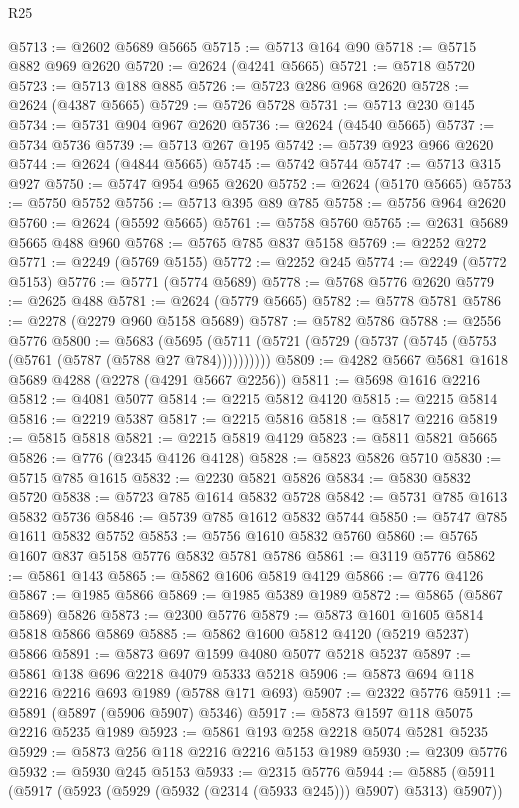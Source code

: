 \begin{lexlean}{R25}
\begin{coremodule}
@5713 := @2602 @5689 @5665
@5715 := @5713 @164 @90
@5718 := @5715 @882 @969 @2620
@5720 := @2624 (@4241 @5665)
@5721 := @5718 @5720
@5723 := @5713 @188 @885
@5726 := @5723 @286 @968 @2620
@5728 := @2624 (@4387 @5665)
@5729 := @5726 @5728
@5731 := @5713 @230 @145
@5734 := @5731 @904 @967 @2620
@5736 := @2624 (@4540 @5665)
@5737 := @5734 @5736
@5739 := @5713 @267 @195
@5742 := @5739 @923 @966 @2620
@5744 := @2624 (@4844 @5665)
@5745 := @5742 @5744
@5747 := @5713 @315 @927
@5750 := @5747 @954 @965 @2620
@5752 := @2624 (@5170 @5665)
@5753 := @5750 @5752
@5756 := @5713 @395 @89 @785
@5758 := @5756 @964 @2620
@5760 := @2624 (@5592 @5665)
@5761 := @5758 @5760
@5765 := @2631 @5689 @5665 @488 @960
@5768 := @5765 @785 @837 @5158
@5769 := @2252 @272
@5771 := @2249 (@5769 @5155)
@5772 := @2252 @245
@5774 := @2249 (@5772 @5153)
@5776 := @5771 (@5774 @5689)
@5778 := @5768 @5776 @2620
@5779 := @2625 @488
@5781 := @2624 (@5779 @5665)
@5782 := @5778 @5781
@5786 := @2278 (@2279 @960 @5158 @5689)
@5787 := @5782 @5786
@5788 := @2556 @5776
@5800 := @5683
    (@5695 (@5711 (@5721 (@5729 (@5737 (@5745 (@5753 (@5761 (@5787 (@5788 @27 @784))))))))))
@5809 := @4282 @5667 @5681 @1618 @5689 @4288 (@2278 (@4291 @5667 @2256))
@5811 := @5698 @1616 @2216
@5812 := @4081 @5077
@5814 := @2215 @5812 @4120
@5815 := @2215 @5814
@5816 := @2219 @5387
@5817 := @2215 @5816
@5818 := @5817 @2216
@5819 := @5815 @5818
@5821 := @2215 @5819 @4129
@5823 := @5811 @5821 @5665
@5826 := @776 (@2345 @4126 @4128)
@5828 := @5823 @5826 @5710
@5830 := @5715 @785 @1615
@5832 := @2230 @5821 @5826
@5834 := @5830 @5832 @5720
@5838 := @5723 @785 @1614 @5832 @5728
@5842 := @5731 @785 @1613 @5832 @5736
@5846 := @5739 @785 @1612 @5832 @5744
@5850 := @5747 @785 @1611 @5832 @5752
@5853 := @5756 @1610 @5832 @5760
@5860 := @5765 @1607 @837 @5158 @5776 @5832 @5781 @5786
@5861 := @3119 @5776
@5862 := @5861 @143
@5865 := @5862 @1606 @5819 @4129
@5866 := @776 @4126
@5867 := @1985 @5866
@5869 := @1985 @5389 @1989
@5872 := @5865 (@5867 @5869) @5826
@5873 := @2300 @5776
@5879 := @5873 @1601 @1605 @5814 @5818 @5866 @5869
@5885 := @5862 @1600 @5812 @4120 (@5219 @5237) @5866
@5891 := @5873 @697 @1599 @4080 @5077 @5218 @5237
@5897 := @5861 @138 @696 @2218 @4079 @5333 @5218
@5906 := @5873 @694 @118 @2216 @2216 @693 @1989 (@5788 @171 @693)
@5907 := @2322 @5776
@5911 := @5891 (@5897 (@5906 @5907) @5346)
@5917 := @5873 @1597 @118 @5075 @2216 @5235 @1989
@5923 := @5861 @193 @258 @2218 @5074 @5281 @5235
@5929 := @5873 @256 @118 @2216 @2216 @5153 @1989
@5930 := @2309 @5776
@5932 := @5930 @245 @5153
@5933 := @2315 @5776
@5944 := @5885 (@5911 (@5917 (@5923 (@5929 (@5932 (@2314 (@5933 @245))) @5907) @5313) @5907))

\end{coremodule}
\end{lexlean}
